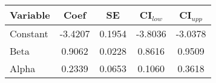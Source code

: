 \begin{tabular}{lcccc}
\hline
Variable & Coef & SE & CI$_{low}$ & CI$_{upp}$ \\
\hline
Constant & -3.4207 & 0.1954 & -3.8036 & -3.0378 \\
Beta & 0.9062 & 0.0228 & 0.8616 & 0.9509 \\
Alpha & 0.2339 & 0.0653 & 0.1060 & 0.3618 \\
\hline
\end{tabular}
